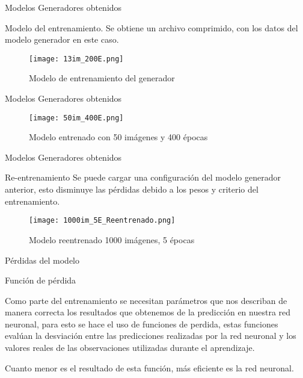 \begin{frame}{Modelos Generadores obtenidos}
    \begin{block}{Modelo del entrenamiento.}
        Se obtiene un archivo comprimido, con los datos del modelo generador en este caso.
    \end{block}
    \begin{figure}[H]
        \begin{center}
          \texttt{[image: 13im\_200E.png]}
          \caption{Modelo de entrenamiento del generador}
          \label{Alexis6}
        \end{center}
    \end{figure}
    
\end{frame}

\begin{frame}{Modelos Generadores obtenidos}
  
    \begin{figure}[H]
        \begin{center}
          \texttt{[image: 50im\_400E.png]}
          \caption{Modelo entrenado con 50 imágenes y 400 épocas}
          \label{Alexis7}
        \end{center}
    \end{figure}
     
\end{frame}


\begin{frame}{Modelos Generadores obtenidos}
    \begin{block}{Re-entrenamiento}
        Se puede cargar una configuración del modelo generador anterior, esto disminuye las pérdidas 
        debido a los pesos y criterio del entrenamiento.
    \end{block}
    \begin{figure}[H]
        \begin{center}
          \texttt{[image: 1000im\_5E\_Reentrenado.png]}
          \caption{Modelo reentrenado 1000 imágenes, 5 épocas}
          \label{Alexis8}
        \end{center}
    \end{figure}
     
\end{frame}


\begin{frame}{Pérdidas del modelo}
    \begin{block}{Función de pérdida}
        
   
        Como parte del entrenamiento se necesitan parámetros que nos describan de manera correcta los resultados
        que obtenemos de la predicción en nuestra red neuronal, para esto se hace el uso de funciones de perdida, estas funciones 
        evalúan la desviación entre las predicciones realizadas por la red neuronal y los valores 
        reales de las observaciones utilizadas durante el aprendizaje.
        
        Cuanto menor es el resultado de esta función, 
        más eficiente es la red neuronal.

    \end{block}    
\end{frame}

